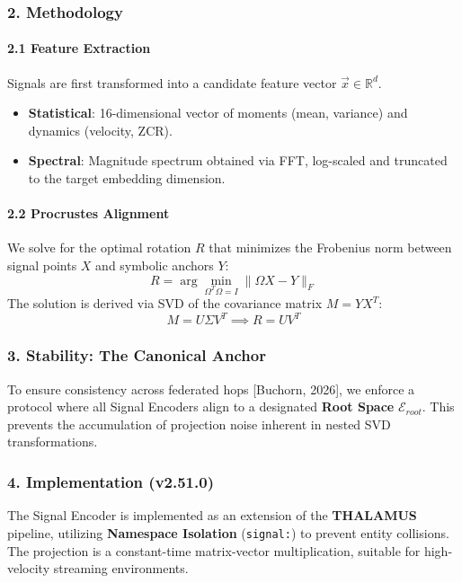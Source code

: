 \subsubsection{2. Methodology}

\paragraph{2.1 Feature Extraction}
Signals are first transformed into a candidate feature vector $\vec{x} \in \mathbb{R}^d$.
\begin{itemize}
\item \textbf{Statistical}: 16-dimensional vector of moments (mean, variance) and dynamics (velocity, ZCR).
\item \textbf{Spectral}: Magnitude spectrum obtained via FFT, log-scaled and truncated to the target embedding dimension.

\end{itemize}
\paragraph{2.2 Procrustes Alignment}
We solve for the optimal rotation $R$ that minimizes the Frobenius norm between signal points $X$ and symbolic anchors $Y$:
\begin{equation}
R = \arg\min_{\Omega^T\Omega=I} \| \Omega X - Y \|_F
\end{equation}
The solution is derived via SVD of the covariance matrix $M = Y X^T$:
\begin{equation}
M = U \Sigma V^T \implies R = U V^T
\end{equation}

\subsubsection{3. Stability: The Canonical Anchor}
To ensure consistency across federated hops [Buchorn, 2026], we enforce a protocol where all Signal Encoders align to a designated \textbf{Root Space} $\mathcal{E}_{root}$. This prevents the accum\-ulation of projection noise inherent in nested SVD trans\-formations.

\subsubsection{4. Implem\-entation (v2.51.0)}
The Signal Encoder is implemented as an extension of the \textbf{THALAMUS} pipeline, utilizing \textbf{Namespace Isolation} (\texttt{signal:}) to prevent entity collisions. The projection is a constant-time matrix-vector multi\-plication, suitable for high-velocity streaming envir\-onments.

